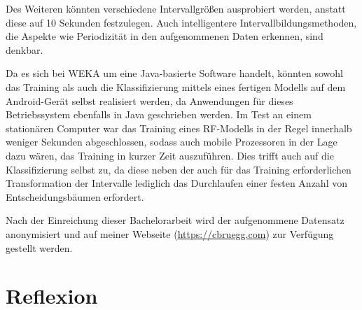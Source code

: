 Des Weiteren könnten verschiedene Intervallgrößen ausprobiert werden, anstatt diese auf 10 Sekunden festzulegen. Auch intelligentere Intervallbildungsmethoden, die Aspekte wie Periodizität in den aufgenommenen Daten erkennen, sind denkbar.

Da es sich bei WEKA um eine Java-basierte Software handelt, könnten sowohl das Training als auch die Klassifizierung mittels eines fertigen Modells auf dem Android-Gerät selbst realisiert werden, da Anwendungen für dieses Betriebssystem ebenfalls in Java geschrieben werden. Im Test an einem stationären Computer war das Training eines RF-Modells in der Regel innerhalb weniger Sekunden abgeschlossen, sodass auch mobile Prozessoren in der Lage dazu wären, das Training in kurzer Zeit auszuführen. Dies trifft auch auf die Klassifizierung selbst zu, da diese neben der auch für das Training erforderlichen Transformation der Intervalle lediglich das Durchlaufen einer festen Anzahl von Entscheidungsbäumen erfordert.

Nach der Einreichung dieser Bachelorarbeit wird der aufgenommene Datensatz anonymisiert und auf meiner Webseite (\url{https://cbruegg.com}) zur Verfügung gestellt werden.


\section{Reflexion}
\todo{}


